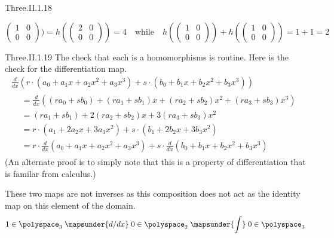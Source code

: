 \begin{ans}{Three.II.1.18}
\begin{exparts*}
\begin{equation*}
\begin{pmatrix}
              1  &0  \\
              0  &0
            \end{pmatrix})
           =h(\begin{pmatrix}
              2  &0  \\
              0  &0
            \end{pmatrix})
           =4
           \quad\text{while}\quad
            h(\begin{pmatrix}
              1  &0  \\
              0  &0
            \end{pmatrix})
            +h(\begin{pmatrix}
              1  &0  \\
              0  &0
            \end{pmatrix})
            =1+1
            =2
          \end{equation*}
      \end{exparts*}
    
\end{ans}
\begin{ans}{Three.II.1.19}
      The check that each is a homomorphisms is routine.
      Here is the check for the differentiation map.
      \begin{multline*}
        \frac{d}{dx}(r\cdot (a_0+a_1x+a_2x^2+a_3x^3)
                    +s\cdot (b_0+b_1x+b_2x^2+b_3x^3))                 \\
        \begin{aligned}
           &=\frac{d}{dx}((ra_0+sb_0)+(ra_1+sb_1)x+(ra_2+sb_2)x^2
                                                    +(ra_3+sb_3)x^3)  \\
           &=(ra_1+sb_1)+2(ra_2+sb_2)x+3(ra_3+sb_3)x^2         \\
           &=r\cdot (a_1+2a_2x+3a_3x^2)+s\cdot (b_1+2b_2x+3b_3x^2)         \\
           &=r\cdot \frac{d}{dx}(a_0+a_1x+a_2x^2+a_3x^3)
                    +s\cdot \frac{d}{dx} (b_0+b_1x+b_2x^2+b_3x^3)
        \end{aligned}
      \end{multline*}
      (An alternate proof is to simply note that this is a
      property of differentiation that is familar from calculus.)

      These two maps are not inverses as this composition
      does not act as the identity map on
      this element of the domain.
      \begin{equation*}
        1\in\polyspace_3\;\mapsunder{d/dx}\;
        0\in\polyspace_2\;\mapsunder{\int}\;
        0\in\polyspace_3
      \end{equation*}
     
\end{ans}
